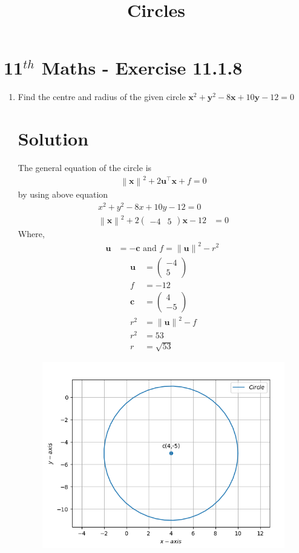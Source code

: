 \documentclass[12pt]{article}
\providecommand{\norm}[1]{\left\lVert#1\right\rVert}
\newcommand{\myvec}[1]{\ensuremath{\begin{pmatrix}#1\end{pmatrix}}}
\let\vec\mathbf
\begin{document}
\begin{center}
\title{\textbf{Circles}}
\date{\vspace{-5ex}} %
\maketitle
\end{center}
\setcounter{page}{1}
\section{11$^{th}$ Maths - Exercise 11.1.8}

\begin{enumerate}
\item Find the centre and radius of the given circle $\vec{x}^2+\vec{y}^2-8\vec{x}+10\vec{y}-12=0$
\section{Solution}
The general equation of  the circle is 
\begin{align}
\norm{\vec{x}}^{2} + 2\vec{u}^{\top}\vec{x} + f = 0
\end{align}
by using above equation
\begin{align}
	x^2+y^2-8x+10y-12=0\\
	\norm{\vec{x}}^2+2\myvec{-4 & 5}\vec{x}-12&=0
\end{align}	
Where,
\begin{align}
	\vec{u} &= -\vec{c} \text{ and } f = \norm{\vec{u}}^{2} - r^{2}\
\end{align}
\begin{align}
 \vec{u}&=\myvec{-4\\5}\\
 f&=-12\\
\vec{c}&=\myvec{4 \\ -5}\\
r^2&=\norm{\vec{u}}^2-f\\
r^2&= 53\\
r&=\sqrt{53}
\end{align}
\begin{figure}[!h]
	\begin{center} 
	   \includegraphics[width=\columnwidth]{figs/11.1.8.png}

\end{center}
\end{figure}
\end{enumerate}
\end{document}
